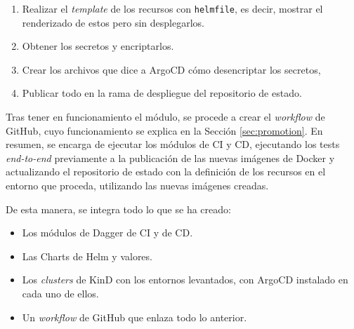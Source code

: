 \begin{enumerate}
  \item Realizar el \textit{template} de los recursos con \texttt{helmfile}, es decir, mostrar el renderizado de estos pero sin desplegarlos.
  \item Obtener los secretos y encriptarlos.
  \item Crear los archivos que dice a ArgoCD cómo desencriptar los secretos,
  \item Publicar todo en la rama de despliegue del repositorio de estado.
\end{enumerate}

Tras tener en funcionamiento el módulo, se procede a crear el \textit{workflow} de GitHub, cuyo funcionamiento se explica en la Sección \ref{sec:promotion}. En resumen, se encarga de ejecutar los módulos de CI y CD, ejecutando los tests \textit{end-to-end} previamente a la publicación de las nuevas imágenes de Docker y actualizando el repositorio de estado con la definición de los recursos en el entorno que proceda, utilizando las nuevas imágenes creadas.

De esta manera, se integra todo lo que se ha creado:

\begin{itemize}
  \item Los módulos de Dagger de CI y de CD.
  \item Las Charts de Helm y valores.
  \item Los \textit{clusters} de KinD con los entornos levantados, con ArgoCD instalado en cada uno de ellos.
  \item Un \textit{workflow} de GitHub que enlaza todo lo anterior.
\end{itemize}
